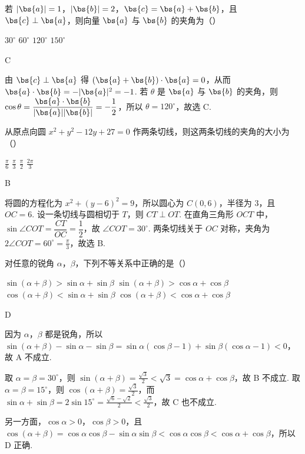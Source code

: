 \begin{problem}
若 \(|\bs{a}|=1\)，\(|\bs{b}|=2\)，\(\bs{c}=\bs{a}+\bs{b}\)，且 \(\bs{c}\perp\bs{a}\)，则向量 \(\bs{a}\) 与 \(\bs{b}\) 的夹角为（\quad）

\choices
    {\(30^{\circ}\)}
    {\(60^{\circ}\)}
    {\(120^{\circ}\)}
    {\(150^{\circ}\)}
\begin{answer}
C
\end{answer}
\end{problem}

\begin{solution}
由 \(\bs{c}\perp\bs{a}\) 得 \((\bs{a}+\bs{b})\cdot\bs{a}=0\)，从而 \(\bs{a}\cdot\bs{b}=-|\bs{a}|^2=-1\). 若 \(\theta\) 是 \(\bs{a}\) 与 \(\bs{b}\) 的夹角，则 \(\cos\theta=\dfrac{\bs{a}\cdot\bs{b}}{|\bs{a}||\bs{b}|}=-\dfrac12\)，所以 \(\theta=120^{\circ}\)，故选 C.
\end{solution}

\begin{problem}
从原点向圆 \(x^2+y^2-12y+27=0\) 作两条切线，则这两条切线的夹角的大小为（\quad）

\choices
    {\(\frac{\pi}{6}\)}
    {\(\frac{\pi}{3}\)}
    {\(\frac{\pi}{2}\)}
    {\(\frac{2\pi}{3}\)}
\begin{answer}
B
\end{answer}
\end{problem}

\begin{solution}
将圆的方程化为 \(x^2+(y-6)^2=9\)，所以圆心为 \(C(0,6)\)，半径为 \(3\)，且 \(OC=6\). 设一条切线与圆相切于 \(T\)，则 \(CT\perp OT\). 在直角三角形 \(OCT\) 中，\(\sin\angle COT=\dfrac{CT}{OC}=\dfrac12\)，故 \(\angle COT=30^{\circ}\). 两条切线关于 \(OC\) 对称，夹角为 \(2\angle COT=60^{\circ}=\frac{\pi}{3}\)，故选 B.
\end{solution}

\begin{problem}
对任意的锐角 \(\alpha\)，\(\beta\)，下列不等关系中正确的是（\quad）

\choices
    {\(\sin(\alpha+\beta)>\sin\alpha+\sin\beta\)}
    {\(\sin(\alpha+\beta)>\cos\alpha+\cos\beta\)}
    {\(\cos(\alpha+\beta)<\sin\alpha+\sin\beta\)}
    {\(\cos(\alpha+\beta)<\cos\alpha+\cos\beta\)}
\begin{answer}
D
\end{answer}
\end{problem}

\begin{solution}
因为 \(\alpha\)，\(\beta\) 都是锐角，所以
\(\sin(\alpha+\beta)-\sin\alpha-\sin\beta
=\sin\alpha(\cos\beta-1)+\sin\beta(\cos\alpha-1)<0\)，故 A 不成立.

取 \(\alpha=\beta=30^{\circ}\)，则 \(\sin(\alpha+\beta)=\frac{\sqrt3}{2}<\sqrt3=\cos\alpha+\cos\beta\)，故 B 不成立. 取 \(\alpha=\beta=15^{\circ}\)，则 \(\cos(\alpha+\beta)=\frac{\sqrt3}{2}\)，而 \(\sin\alpha+\sin\beta=2\sin15^{\circ}=\frac{\sqrt6-\sqrt2}{2}<\frac{\sqrt3}{2}\)，故 C 也不成立.

另一方面，\(\cos\alpha>0\)，\(\cos\beta>0\)，且
\(\cos(\alpha+\beta)=\cos\alpha\cos\beta-\sin\alpha\sin\beta<\cos\alpha\cos\beta<\cos\alpha+\cos\beta\)，所以 D 正确.
\end{solution}

